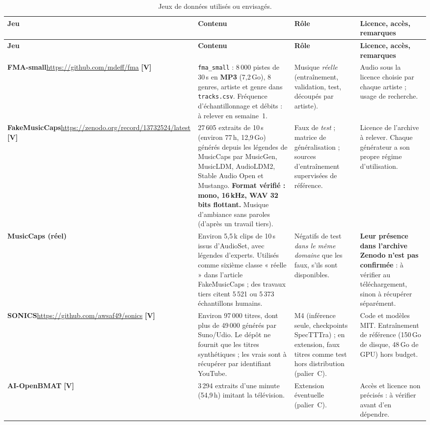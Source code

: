 \documentclass[11pt,a4paper]{article}
\newcommand{\sV}{\textbf{[V]}}
\begin{document}
{\small
\begin{longtable}{L{2.5cm}L{5.4cm}L{3.1cm}L{4.1cm}}
\caption{Jeux de données utilisés ou envisagés.}\label{tab:donnees}\\
\toprule
\textbf{Jeu} & \textbf{Contenu} & \textbf{Rôle} & \textbf{Licence, accès, remarques}\\
\midrule
\endfirsthead
\toprule
\textbf{Jeu} & \textbf{Contenu} & \textbf{Rôle} & \textbf{Licence, accès, remarques}\\
\midrule
\endhead
\bottomrule
\endfoot
\textbf{FMA-small}\newline \url{https://github.com/mdeff/fma} \sV &
\texttt{fma\_small} : 8\,000 pistes de 30\,s en \textbf{MP3} (7,2\,Go), 8 genres, artiste et genre dans \texttt{tracks.csv}. Fréquence d'échantillonnage et débits : à relever en semaine~1. &
Musique \emph{réelle} (entraînement, validation, test, découpés par artiste). &
Audio sous la licence choisie par chaque artiste ; usage de recherche.\\
\textbf{FakeMusicCaps}\newline \url{https://zenodo.org/record/13732524/latest} \sV &
27\,605 extraits de 10\,s (environ 77\,h, 12,9\,Go) générés depuis les légendes de MusicCaps par MusicGen, MusicLDM, AudioLDM2, Stable Audio Open et Mustango. \textbf{Format vérifié : mono, 16\,kHz, WAV 32 bits flottant.} Musique d'ambiance sans paroles (d'après un travail tiers). &
Faux de \emph{test} ; matrice de généralisation ; sources d'entraînement supervisées de référence. &
Licence de l'archive à relever. Chaque générateur a son propre régime d'utilisation.\\
\textbf{MusicCaps (réel)} &
Environ 5,5\,k clips de 10\,s issus d'AudioSet, avec légendes d'experts. Utilisés comme sixième classe « réelle » dans l'article FakeMusicCaps ; des travaux tiers citent 5\,521 ou 5\,373 échantillons humains. &
Négatifs de test \emph{dans le même domaine} que les faux, s'ils sont disponibles. &
\textbf{Leur présence dans l'archive Zenodo n'est pas confirmée} : à vérifier au téléchargement, sinon à récupérer séparément.\\
\textbf{SONICS}\newline \url{https://github.com/awsaf49/sonics} \sV &
Environ 97\,000 titres, dont plus de 49\,000 générés par Suno/Udio. Le dépôt ne fournit que les titres synthétiques ; les vrais sont à récupérer par identifiant YouTube. &
M4 (inférence seule, checkpoints SpecTTTra) ; en extension, faux titres comme test hors distribution (palier~C). &
Code et modèles MIT. Entraînement de référence (150\,Go de disque, 48\,Go de GPU) hors budget.\\
\textbf{AI-OpenBMAT} \sV &
3\,294 extraits d'une minute (54,9\,h) imitant la télévision. &
Extension éventuelle (palier~C). &
Accès et licence non précisés : à vérifier avant d'en dépendre.\\
\end{longtable}
}
\end{document}
